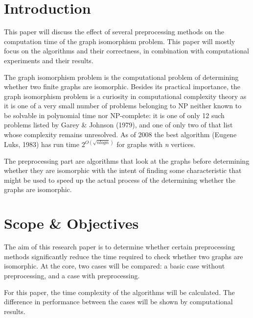 \documentclass[twoside]{article}
\theoremstyle{definition}
\theoremstyle{plain}
\begin{document}
\begin{multicols}{2} %

\section{Introduction} 

This paper will discuss the effect of several preprocessing methods on the computation time of the graph isomorphism problem. This paper will mostly focus on the algorithms and their correctness, in combination with computational experiments and their results.

The graph isomorphism problem is the computational problem of determining whether two finite graphs are isomorphic. Besides its practical importance, the graph isomorphism problem is a curiosity in computational complexity theory as it is one of a very small number of problems belonging to NP neither known to be solvable in polynomial time nor NP-complete: it is one of only 12 such problems listed by Garey \& Johnson (1979)\cite{book:garyJohnson1979}, and one of only two of that list whose complexity remains unresolved. As of 2008 the best algorithm (Eugene Luks, 1983) has run time $2^{O(\sqrt{n log n})}$ for graphs with \emph{n} vertices.\cite{article:davidJohnson2005}\cite{inproceedings:babaiCodenotti2008}\cite{website:wikiGI}

The preprocessing part are algorithms that look at the graphs before determining whether they are isomorphic with the intent of finding some characteristic that might be used to speed up the actual process of the determining whether the graphs are isomorphic.


\section{Scope \& Objectives}

The aim of this research paper is to determine whether certain preprocessing methods significantly reduce the time required to check whether two graphs are isomorphic. At the core, two cases will be compared: a basic case without preprocessing, and a case with preprocessing. 

For this paper, the time complexity of the algorithms will be calculated. The difference in performance between the cases will be shown by computational results.


\end{multicols}
\end{document}
